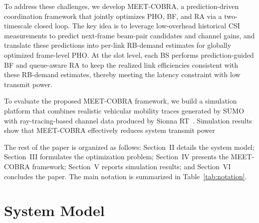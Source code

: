 \documentclass[conference, a4paper]{IEEEtran}
\newcommand{\rev}[1]{\textcolor{revisioncolor}{{}#1}}
\newif\ifshowdeletions
\newcommand{\currentdel}[1]{\ifshowdeletions\textcolor{deletioncolor}{\sout{#1}}\fi}
\theoremstyle{remark}
\begin{document}
To address these challenges, we develop MEET-COBRA, a prediction-driven coordination framework that jointly optimizes PHO, BF, and RA via a two-timescale closed loop. 
The key idea is to leverage low-overhead historical CSI measurements to predict next-frame beam-pair candidates and channel gains, and translate these predictions into per-link RB-demand estimates for globally optimized frame-level PHO. At the slot level, each BS performs prediction-guided BF and queue-aware RA to keep the realized link efficiencies consistent with these RB-demand estimates, thereby meeting the latency constraint with low transmit power.

To evaluate the proposed MEET-COBRA framework, we build a simulation platform that combines realistic vehicular mobility traces generated by SUMO~\cite{behrisch2011sumo} with ray-tracing-based channel data produced by Sionna RT~\cite{sionnaRT}. 
Simulation results show that MEET-COBRA effectively reduces system transmit power \currentdel{while improving the adherence to latency constraints across different traffic loads.}




The rest of the paper is organized as follows: Section~II details the system model; Section~III formulates the optimization problem; Section~IV presents the MEET-COBRA framework; Section~V reports simulation results; and Section~VI concludes the paper.
\rev{The main notation is summarized in Table~\ref{tab:notation}.}


\section{System Model}{\label{sec:System Model}}
\end{document}
